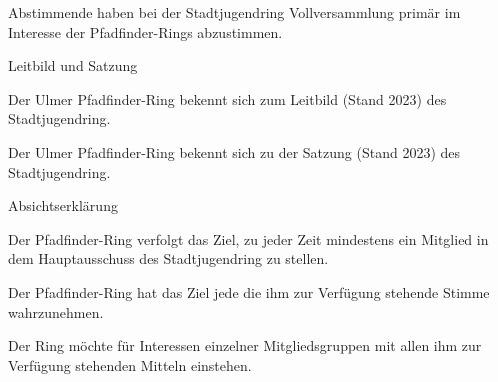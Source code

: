 \begin{legal}
\begin{legal}
\begin{legal}
                    \item Abstimmende haben bei der Stadtjugendring Vollversammlung primär im 
                          Interesse der Pfadfinder-Rings abzustimmen.
                \end{legal}
            \item Leitbild und Satzung
                \begin{legal}
                    \item Der Ulmer Pfadfinder-Ring bekennt sich zum Leitbild (Stand 2023) des 
                          Stadtjugendring.
                    \item Der Ulmer Pfadfinder-Ring bekennt sich zu der Satzung (Stand 2023) des 
                          Stadtjugendring.
                \end{legal}
        \end{legal}
    \item Absichtserklärung
        \begin{legal}
            \item Der Pfadfinder-Ring verfolgt das Ziel, zu jeder Zeit mindestens ein Mitglied in 
                  dem Hauptausschuss des Stadtjugendring zu stellen.
            \item Der Pfadfinder-Ring hat das Ziel jede die ihm zur Verfügung stehende Stimme 
                  wahrzunehmen.
            \item Der Ring möchte für Interessen einzelner Mitgliedsgruppen mit allen ihm zur 
                  Verfügung stehenden Mitteln einstehen.
        \end{legal}
\end{legal}
